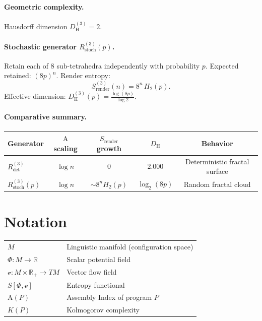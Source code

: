 \documentclass[12pt,a4paper]{article}
\theoremstyle{plain}
\theoremstyle{definition}
\theoremstyle{remark}
\newcommand{\Phifield}{\Phi}
\newcommand{\vfield}{\mathcal{v}}
\newcommand{\Sfield}{S}
\newcommand{\AI}{\mathrm{A}}
\begin{document}
\paragraph{Geometric complexity.}
Hausdorff dimension $D_{\mathrm{H}}^{(3)}=2$.

\paragraph{Stochastic generator $R^{(3)}_{\mathrm{stoch}}(p)$.}
Retain each of $8$ sub-tetrahedra independently with probability $p$. Expected retained: $(8p)^n$. Render entropy:
\[
\Sfield_{\mathrm{render}}^{(3)}(n) =8^n\,H_2(p).
\]
Effective dimension: $D_{\mathrm{H}}^{(3)}(p)=\frac{\log (8p)}{\log 2}$.

\paragraph{Comparative summary.}
\begin{center}
\renewcommand{\arraystretch}{1.2}
\begin{tabular}{@{}lcccc@{}}
\toprule
Generator & $\AI$ scaling & $\Sfield_{\text{render}}$ growth & $D_{\mathrm{H}}$ & Behavior \\
\midrule
$R^{(3)}_{\mathrm{det}}$ & $\log n$ & $0$ & $2.000$ & Deterministic fractal surface \\
$R^{(3)}_{\mathrm{stoch}}(p)$ & $\log n$ & $\sim8^{n}H_2(p)$ & $\log_2(8p)$ & Random fractal cloud \\
\bottomrule
\end{tabular}
\end{center}

\section*{Notation}
\begin{tabular}{ll}
$M$ & Linguistic manifold (configuration space) \\
$\Phifield : M \to \mathbb{R}$ & Scalar potential field \\
$\vfield : M \times \mathbb{R}_+ \to TM$ & Vector flow field \\
$\Sfield[\Phifield, \vfield]$ & Entropy functional \\
$\AI(P)$ & Assembly Index of program $P$ \\
$K(P)$ & Kolmogorov complexity \\
\end{tabular}
\end{document}
